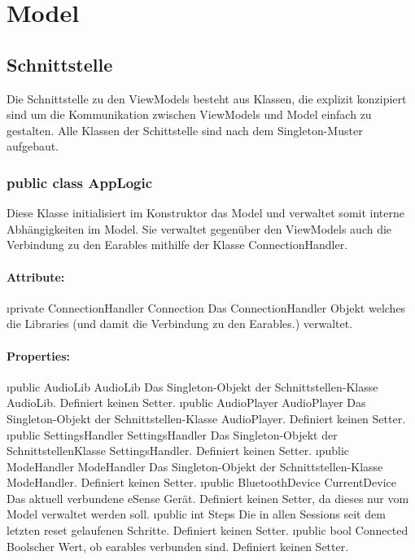 \documentclass[../entwurf.tex]{subfiles}
\begin{document}
	\section{Model}
		\subsection{Schnittstelle}
			Die Schnittstelle zu den ViewModels besteht aus Klassen, die explizit konzipiert sind um die Kommunikation zwischen ViewModels und Model
			einfach zu gestalten. Alle Klassen der Schittstelle sind nach dem Singleton-Muster aufgebaut.
			\subsubsection{public class AppLogic}
				Diese Klasse initialisiert im Konstruktor das Model und verwaltet somit interne Abhängigkeiten im Model. Sie verwaltet gegenüber den
				ViewModels auch die Verbindung zu den Earables mithilfe der Klasse ConnectionHandler.
				\paragraph{Attribute:}
					\begin{itemize}
						\i{private ConnectionHandler Connection} Das ConnectionHandler Objekt welches die Libraries
						(und damit die Verbindung zu den Earables.) verwaltet.
					\end{itemize}
				\paragraph{Properties:}
					\begin{itemize}
						\i{public AudioLib AudioLib} Das Singleton-Objekt der Schnittstellen-Klasse AudioLib. Definiert keinen Setter.
						\i{public AudioPlayer AudioPlayer} Das Singleton-Objekt der Schnittstellen-Klasse AudioPlayer. Definiert keinen Setter.
						\i{public SettingsHandler SettingsHandler} Das Singleton-Objekt der SchnittstellenKlasse SettingsHandler.
						Definiert keinen Setter.
						\i{public ModeHandler ModeHandler} Das Singleton-Objekt der Schnittstellen-Klasse ModeHandler. Definiert keinen Setter.
						\i{public BluetoothDevice CurrentDevice} Das aktuell verbundene eSense Gerät. Definiert keinen Setter, da dieses nur vom Model
						verwaltet werden soll.
						\i{public int Steps} Die in allen Sessions seit dem letzten reset gelaufenen Schritte. Definiert keinen Setter.
						\i{public bool Connected} Boolscher Wert, ob earables verbunden sind. Definiert keinen Setter.
					\end{itemize}
\end{document}
